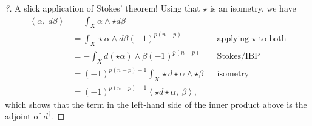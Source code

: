 \begin{proof}[?]

A slick application of Stokes' theorem! Using that \(\star\) is an
isometry, we have
\begin{align*}
{\left\langle { \alpha},~{ d \beta} \right\rangle} 
&= \int_X \alpha\wedge \star d \beta \\
&= \int_X \star\alpha \wedge d \beta 
(-1)^{p(n-p)} 
&& \text{applying $\star$ to both} \\
&= -\int_X d( \star\alpha) \wedge \beta (-1)^{p(n-p)}
&& \text{Stokes/IBP} \\
&= (-1)^{p(n-p)+1} \int_X \star d \star\alpha \wedge \star\beta 
&& \text{isometry}\\
&= (-1)^{p(n-p)+1} {\left\langle {\star d \star\alpha},~{ \beta} \right\rangle}
,\end{align*}
which shows that the term in the left-hand side of the inner product
above is the adjoint of \(d^\dagger\).

\end{proof}

\cleardoublepage

\renewcommand{\listtheoremname}{}
\listoftheorems[ignoreall,show={definition}, numwidth=3.5em]
\cleardoublepage

\renewcommand{\listtheoremname}{}
\listoftheorems[ignoreall,show={theorem,proposition}, numwidth=3.5em]
\cleardoublepage

\renewcommand{\listtheoremname}{}
\listoftheorems[ignoreall,show={exercise}, numwidth=3.5em]
\cleardoublepage

\listoffigures
\cleardoublepage


\printbibliography[title=Bibliography]



